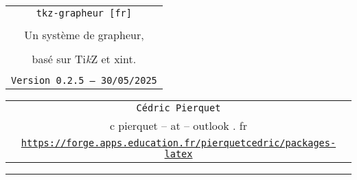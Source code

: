 \documentclass[11pt,a4paper]{ltxdoc}
\providecommand\tikzlogo{Ti\textit{k}Z}
\let\TikZ\tikzlogo
\def\TPversion{0.2.5}
\def\TPdate{30/05/2025}
\begin{document}
\pagestyle{fancy}

\thispagestyle{empty}

\begin{center}
	\begin{minipage}{0.88\linewidth}
	\begin{tcolorbox}[colframe=yellow,colback=yellow!15]
		\begin{center}
			\begin{tabular}{c}
				{\Huge \texttt{tkz-grapheur [fr]}}\\
				\\
				{\LARGE Un système de grapheur,}\\
				\\
				{\LARGE basé sur \textsf{\TikZ} et \textsf{xint}.}\\
				\\
				{\small \texttt{Version \TPversion{} -- \TPdate}}
		\end{tabular}
		\end{center}
	\end{tcolorbox}
\end{minipage}
\end{center}

\begin{center}
	\begin{tabular}{c}
	\texttt{Cédric Pierquet}\\
	{\ttfamily c pierquet -- at -- outlook . fr}\\
	\texttt{\url{https://forge.apps.education.fr/pierquetcedric/packages-latex}} \\
\end{tabular}
\end{center}

\hrule

\vfill
\end{document}
